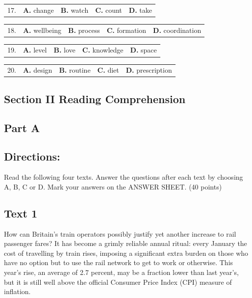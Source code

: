 \documentclass[UTF8,11pt]{ctexart}
\begin{document}
\noindent\begin{tabularx}{\linewidth}{@{}lXXXX@{}}17. & \textbf{A.} change & \textbf{B.} watch & \textbf{C.} count & \textbf{D.} take\\\end{tabularx}\par

\noindent\begin{tabularx}{\linewidth}{@{}lXXXX@{}}18. & \textbf{A.} wellbeing & \textbf{B.} process & \textbf{C.} formation & \textbf{D.} coordination\\\end{tabularx}\par

\noindent\begin{tabularx}{\linewidth}{@{}lXXXX@{}}19. & \textbf{A.} level & \textbf{B.} love & \textbf{C.} knowledge & \textbf{D.} space\\\end{tabularx}\par

\noindent\begin{tabularx}{\linewidth}{@{}lXXXX@{}}20. & \textbf{A.} design & \textbf{B.} routine & \textbf{C.} diet & \textbf{D.} prescription\\\end{tabularx}\par

\subsection*{\textbf{Section II Reading Comprehension}}


\subsection*{\textbf{Part A}}


\subsection*{\textbf{Directions:}}


Read the following four texts. Answer the questions after each text by choosing A, B, C or D. Mark your answers on the ANSWER SHEET. (40 points)


\subsection*{\textbf{Text 1}}


How can Britain’s train operators possibly justify yet another increase to rail passenger fares? It has become a grimly reliable annual ritual: every January the cost of travelling by train rises, imposing a significant extra burden on those who have no option but to use the rail network to get to work or otherwise. This year’s rise, an average of 2.7 percent, may be a fraction lower than last year’s, but it is still well above the official Consumer Price Index (CPI) measure of inflation.
\end{document}
